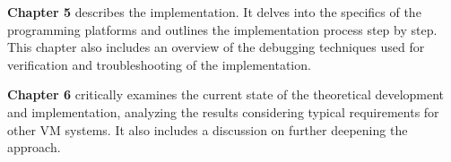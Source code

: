 \textbf{Chapter 5} describes the implementation. It delves into the specifics of the programming platforms and outlines the implementation process step by step. This chapter also includes an overview of the debugging techniques used for verification and troubleshooting of the implementation.

\textbf{Chapter 6} critically examines the current state of the theoretical development and implementation, analyzing the results considering typical requirements for other VM systems. It also includes a discussion on further deepening the approach.











